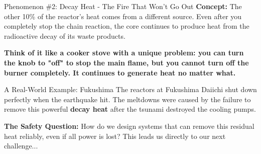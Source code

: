 \documentclass[aspectratio=169]{beamer}
\begin{document}
\begin{frame}[allowframebreaks]{Phenomenon \#2: Decay Heat - The Fire That Won't Go Out}
    \textbf{Concept:} The other 10\% of the reactor's heat comes from a different source. Even after you completely stop the chain reaction, the core continues to produce heat from the radioactive decay of its waste products.
    
    \vspace{1em}
    \textbf{Think of it like a cooker stove with a unique problem: you can turn the knob to "off" to stop the main flame, but you cannot turn off the burner completely. It continues to generate heat no matter what.}
    
    \vspace{1em}
    \begin{block}{A Real-World Example: Fukushima}
        The reactors at Fukushima Daiichi shut down perfectly when the earthquake hit. The meltdowns were caused by the failure to remove this powerful \textbf{decay heat} after the tsunami destroyed the cooling pumps.
    \end{block}

    \vspace{1em}
    \textbf{The Safety Question:} How do we design systems that can remove this residual heat reliably, even if all power is lost? This leads us directly to our next challenge...
\end{frame}
\end{document}
